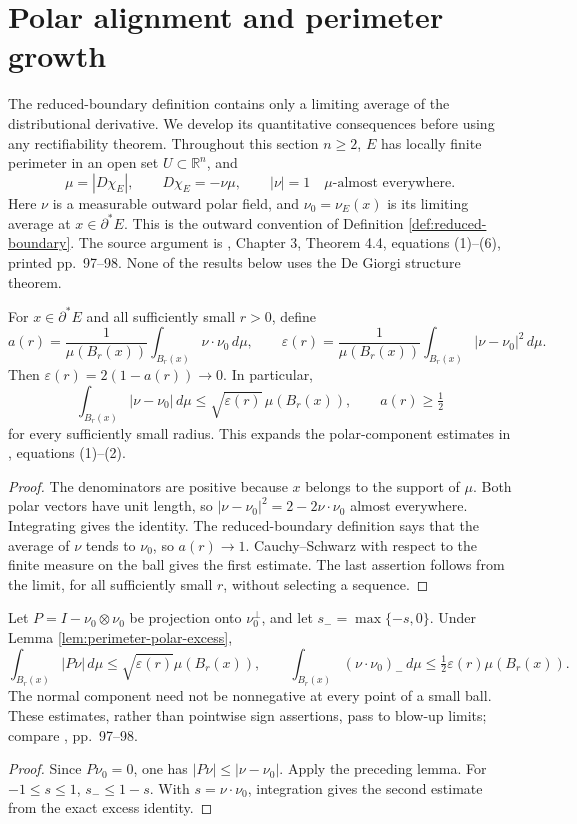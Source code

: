 \chapter{Polar alignment and perimeter growth}\label{sec:perimeter-polar-growth}
The reduced-boundary definition contains only a limiting average of the distributional derivative. We develop its quantitative consequences before using any rectifiability theorem. Throughout this section $n\geq2$, $E$ has locally finite perimeter in an open set $U\subset\mathbb R^n$, and
\[
 \mu=|D\chi_E|,\qquad D\chi_E=-\nu\mu,\qquad |\nu|=1\quad\mu\text{-almost everywhere}.
\]
Here $\nu$ is a measurable outward polar field, and $\nu_0=\nu_E(x)$ is its limiting average at $x\in\partial^*E$. This is the outward convention of Definition \ref{def:reduced-boundary}. The source argument is \cite{Sim18}, Chapter 3, Theorem 4.4, equations (1)--(6), printed pp.~97--98. None of the results below uses the De Giorgi structure theorem.

\begin{lemma}\label{lem:perimeter-polar-excess}
For $x\in\partial^*E$ and all sufficiently small $r>0$, define
\[
 a(r)=\frac{1}{\mu(B_r(x))}\int_{B_r(x)}\nu\cdot\nu_0\,d\mu,
 \qquad \varepsilon(r)=\frac{1}{\mu(B_r(x))}
                      \int_{B_r(x)}|\nu-\nu_0|^2\,d\mu.
\]
Then $\varepsilon(r)=2(1-a(r))\to0$. In particular,
\[
 \int_{B_r(x)}|\nu-\nu_0|\,d\mu
 \leq\sqrt{\varepsilon(r)}\,\mu(B_r(x)),
 \qquad a(r)\geq\tfrac12
\]
for every sufficiently small radius. This expands the polar-component estimates in \cite{Sim18}, equations (1)--(2).
\end{lemma}
\begin{proof}
The denominators are positive because $x$ belongs to the support of $\mu$. Both polar vectors have unit length, so $|\nu-\nu_0|^2=2-2\nu\cdot\nu_0$ almost everywhere. Integrating gives the identity. The reduced-boundary definition says that the average of $\nu$ tends to $\nu_0$, so $a(r)\to1$. Cauchy--Schwarz with respect to the finite measure on the ball gives the first estimate. The last assertion follows from the limit, for all sufficiently small $r$, without selecting a sequence.
\end{proof}

\begin{corollary}\label{cor:perimeter-polar-components}
Let $P=I-\nu_0\otimes\nu_0$ be projection onto $\nu_0^\perp$, and let $s_- =\max\{-s,0\}$. Under Lemma \ref{lem:perimeter-polar-excess},
\[
 \int_{B_r(x)}|P\nu|\,d\mu\leq\sqrt{\varepsilon(r)}\mu(B_r(x)),
 \qquad
 \int_{B_r(x)}(\nu\cdot\nu_0)_-\,d\mu
 \leq\tfrac12\varepsilon(r)\mu(B_r(x)).
\]
The normal component need not be nonnegative at every point of a small ball. These estimates, rather than pointwise sign assertions, pass to blow-up limits; compare \cite{Sim18}, pp.~97--98.
\end{corollary}
\begin{proof}
Since $P\nu_0=0$, one has $|P\nu|\leq|\nu-\nu_0|$. Apply the preceding lemma. For $-1\leq s\leq1$, $s_-\leq1-s$. With $s=\nu\cdot\nu_0$, integration gives the second estimate from the exact excess identity.
\end{proof}

